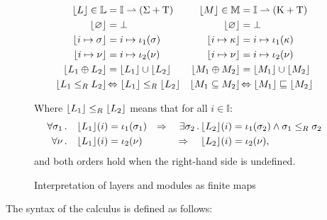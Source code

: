 \begin{figure}
    \small
    \begin{align*}
        \lfloor L \rfloor \in \mathbb{L} &=
            \mathbb{I} \rightharpoonup (\Sigma + \mathrm{T}) &
        \lfloor M \rfloor \in \mathbb{M} &=
            \mathbb{I} \rightharpoonup (\mathrm{K} + \mathrm{T}) \\
        \lfloor \varnothing \rfloor &=
            \bot &
        \lfloor \varnothing \rfloor &=
            \bot \\
        \lfloor i \mapsto \sigma \rfloor &=
            i \mapsto \iota_1(\sigma) &
        \lfloor i \mapsto \kappa \rfloor &=
            i \mapsto \iota_1(\kappa) \\
        \lfloor i \mapsto \nu \rfloor &=
            i \mapsto \iota_2(\nu) &
        \lfloor i \mapsto \nu \rfloor &=
            i \mapsto \iota_2(\nu) \\
        \lfloor L_1 \oplus L_2 \rfloor &=
            \lfloor L_1 \rfloor \cup \lfloor L_2 \rfloor &
        \lfloor M_1 \oplus M_2 \rfloor &=
            \lfloor M_1 \rfloor \cup \lfloor M_2 \rfloor \\
        \lfloor L_1 \le_{R} L_2 \rfloor &\!\Leftrightarrow
            \lfloor L_1 \rfloor \le_{R} \lfloor L_2 \rfloor &
        \lfloor M_1 \subseteq M_2 \rfloor &\!\Leftrightarrow
            \lfloor M_1 \rfloor \sqsubseteq \lfloor M_2 \rfloor
    \end{align*}
    \begin{center}
    Where $\lfloor L_1 \rfloor \le_{R} \lfloor L_2 \rfloor$ means that for all $i \in \mathbb{I}$:
    \begin{align*}
        \forall \sigma_1 \, . \quad
            \lfloor L_1 \rfloor (i) &= \iota_1(\sigma_1) &\Rightarrow\quad
        \exists \sigma_2 \, . \,
            \lfloor L_2 \rfloor (i) &= \iota_1(\sigma_2) \wedge
            \sigma_1 \le_{R} \sigma_2 \\
        \forall \nu \, . \quad
             \lfloor L_1 \rfloor (i) &= \iota_2(\nu) &\Rightarrow\quad
             \lfloor L_2 \rfloor (i) &= \iota_2(\nu),
    \end{align*}
    and both orders hold when the right-hand side is undefined.
    \end{center}
    \caption{Interpretation of layers and modules as finite maps}
    \label{fig:fmap-layers}
\end{figure}


The syntax of the calculus is defined as follows:

